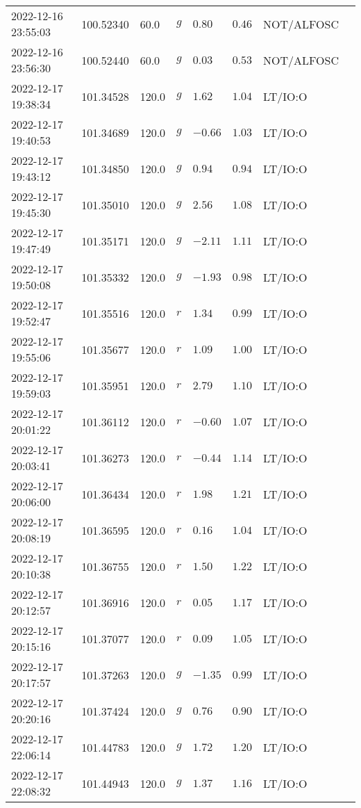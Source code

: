 \documentclass{nature_plusfigure}
\begin{document}
\begin{supplement}
\begin{center}
\begin{longtable}{llllllll}
2022-12-16 23:55:03 & 100.52340 & 60.0 & $g$ & $0.80$ & $0.46$ & NOT/ALFOSC &  \\ 
2022-12-16 23:56:30 & 100.52440 & 60.0 & $g$ & $0.03$ & $0.53$ & NOT/ALFOSC &  \\ 
2022-12-17 19:38:34 & 101.34528 & 120.0 & $g$ & $1.62$ & $1.04$ & LT/IO:O &  \\ 
2022-12-17 19:40:53 & 101.34689 & 120.0 & $g$ & $-0.66$ & $1.03$ & LT/IO:O &  \\ 
2022-12-17 19:43:12 & 101.34850 & 120.0 & $g$ & $0.94$ & $0.94$ & LT/IO:O &  \\ 
2022-12-17 19:45:30 & 101.35010 & 120.0 & $g$ & $2.56$ & $1.08$ & LT/IO:O &  \\ 
2022-12-17 19:47:49 & 101.35171 & 120.0 & $g$ & $-2.11$ & $1.11$ & LT/IO:O &  \\ 
2022-12-17 19:50:08 & 101.35332 & 120.0 & $g$ & $-1.93$ & $0.98$ & LT/IO:O &  \\ 
2022-12-17 19:52:47 & 101.35516 & 120.0 & $r$ & $1.34$ & $0.99$ & LT/IO:O &  \\ 
2022-12-17 19:55:06 & 101.35677 & 120.0 & $r$ & $1.09$ & $1.00$ & LT/IO:O &  \\ 
2022-12-17 19:59:03 & 101.35951 & 120.0 & $r$ & $2.79$ & $1.10$ & LT/IO:O &  \\ 
2022-12-17 20:01:22 & 101.36112 & 120.0 & $r$ & $-0.60$ & $1.07$ & LT/IO:O &  \\ 
2022-12-17 20:03:41 & 101.36273 & 120.0 & $r$ & $-0.44$ & $1.14$ & LT/IO:O &  \\ 
2022-12-17 20:06:00 & 101.36434 & 120.0 & $r$ & $1.98$ & $1.21$ & LT/IO:O &  \\ 
2022-12-17 20:08:19 & 101.36595 & 120.0 & $r$ & $0.16$ & $1.04$ & LT/IO:O &  \\ 
2022-12-17 20:10:38 & 101.36755 & 120.0 & $r$ & $1.50$ & $1.22$ & LT/IO:O &  \\ 
2022-12-17 20:12:57 & 101.36916 & 120.0 & $r$ & $0.05$ & $1.17$ & LT/IO:O &  \\ 
2022-12-17 20:15:16 & 101.37077 & 120.0 & $r$ & $0.09$ & $1.05$ & LT/IO:O &  \\ 
2022-12-17 20:17:57 & 101.37263 & 120.0 & $g$ & $-1.35$ & $0.99$ & LT/IO:O &  \\ 
2022-12-17 20:20:16 & 101.37424 & 120.0 & $g$ & $0.76$ & $0.90$ & LT/IO:O &  \\ 
2022-12-17 22:06:14 & 101.44783 & 120.0 & $g$ & $1.72$ & $1.20$ & LT/IO:O &  \\ 
2022-12-17 22:08:32 & 101.44943 & 120.0 & $g$ & $1.37$ & $1.16$ & LT/IO:O &  \\ 

\end{longtable}
\end{center}
\end{supplement}
\end{document}
